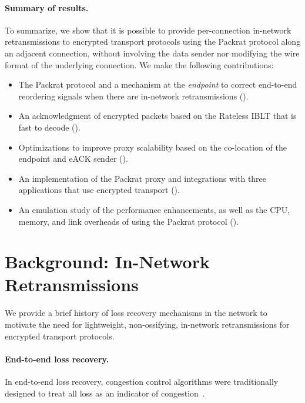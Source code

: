 \paragraph{Summary of results.}
To summarize, we show that it is possible to provide per-connection in-network
retransmissions to encrypted transport protocols using the Packrat protocol along
an adjacent connection, without involving the data sender nor modifying the
wire format of the underlying connection. We make the following contributions:

\begin{itemize}[noitemsep]
    \item The Packrat protocol and a mechanism at the \textit{endpoint} to correct
     end-to-end reordering signals when there are in-network retransmissions
     ().
    \item An acknowledgment of encrypted packets based on the Rateless IBLT
     that is fast to decode ().
    \item Optimizations to improve proxy
     scalability based on the co-location of the endpoint and eACK sender
     ().
    \item An implementation of the Packrat proxy and integrations with three
     applications that use encrypted transport ().
    \item An emulation study of the performance enhancements, as well as the CPU,
     memory, and link overheads of using the Packrat protocol ().
\end{itemize}

\section{Background: In-Network Retransmissions}

We provide a brief history of loss recovery mechanisms in the network to
motivate the need for lightweight, non-ossifying, in-network retransmissions
for encrypted transport protocols.

\paragraph{End-to-end loss recovery.}

In end-to-end loss recovery,
congestion control algorithms were traditionally designed to treat all loss as an indicator of
congestion~\cite{rfc5681tcp,rfc2001tcp}.

